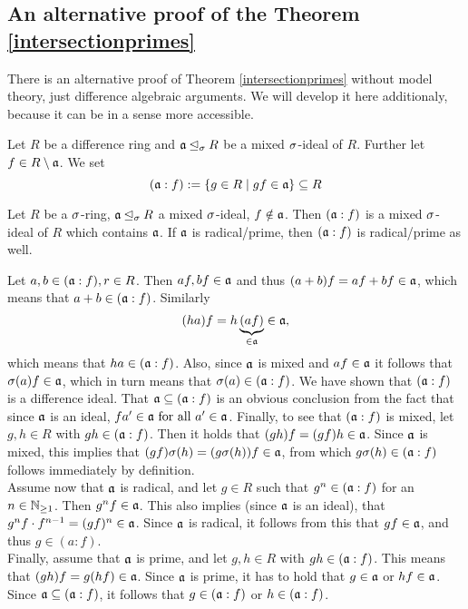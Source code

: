 \subsection{An alternative proof of the Theorem \ref{intersectionprimes}}

There is an alternative proof of Theorem \ref{intersectionprimes} without model theory, just difference algebraic arguments. We will develop it here additionaly, because it can be in a sense more accessible.

\begin{defn}
Let $R$ be a difference ring and $\mathfrak{a} \unlhd_{\sigma} R$ be a mixed $\sigma$-ideal of $R$. Further let $f \in R \setminus \mathfrak{a}$. We set $$(\mathfrak{a}:f):= \{ g \in R \mid gf \in \mathfrak{a} \} \subseteq R$$
\end{defn}

\begin{lem}
Let $R$ be a $\sigma$-ring, $\mathfrak{a} \unlhd_{\sigma} R$ a mixed $\sigma$-ideal, $f \notin \mathfrak{a}$. Then $(\mathfrak{a}:f)$ is a mixed $\sigma$-ideal of $R$ which contains $\mathfrak{a}$. If $\mathfrak{a}$ is radical/prime, then $(\mathfrak{a}:f)$ is radical/prime as well.
\begin{bew}
Let $a,b \in (\mathfrak{a}:f), r \in R$. Then $af, bf \in \mathfrak{a}$ and thus $(a + b)f = af + bf \in \mathfrak{a}$, which means that $a + b \in (\mathfrak{a}:f)$. Similarly $$(ha)f = h\underbrace{(af)}_{\in \mathfrak{a}} \in \mathfrak{a},$$
which means that $ha \in (\mathfrak{a}:f)$. Also, since $\mathfrak{a}$ is mixed and $af \in \mathfrak{a}$ it follows that $\sigma(a)f \in \mathfrak{a}$, which in turn means that $\sigma(a) \in (\mathfrak{a}:f)$. We have shown that $(\mathfrak{a}:f)$ is a difference ideal. 
That $\mathfrak{a} \subseteq (\mathfrak{a}:f)$ is an obvious conclusion from the fact that since $\mathfrak{a}$ is an ideal, $fa' \in \mathfrak{a} \text{ for all } a' \in \mathfrak{a}$.  Finally, to see that $(\mathfrak{a}:f)$ is mixed,
let $g,h \in R$ with $gh \in (\mathfrak{a}:f)$. Then it holds that $(gh)f = (gf)h  \in \mathfrak{a}$. Since $\mathfrak{a}$ is mixed, this implies that $(gf)\sigma(h) = (g\sigma(h))f \in \mathfrak{a}$, from which $g\sigma(h) \in (\mathfrak{a}:f)$ follows immediately by definition. \\
\indent Assume now that $\mathfrak{a}$ is radical, and let $g \in R$ such that $g^n \in (\mathfrak{a}:f)$ for an $n \in \mathbb{N}_{\geq1}$. Then $g^nf \in \mathfrak{a}$. This also implies (since $\mathfrak{a}$ is an ideal), that $g^nf \cdot f^{n-1} = (gf)^n \in \mathfrak{a}$.
Since $\mathfrak{a}$ is radical, it follows from this that $gf \in \mathfrak{a}$, and thus $g \in (a:f)$.\\ 
\indent Finally, assume that $\mathfrak{a}$ is prime, and let $g, h \in R$ with $gh \in (\mathfrak{a}:f)$. This means that $(gh)f = g(hf) \in \mathfrak{a}$. Since $\mathfrak{a}$ is prime, it has to hold that $g \in \mathfrak{a}$ or $hf \in \mathfrak{a}$. Since $\mathfrak{a} \subseteq (\mathfrak{a}:f)$, it follows that $g \in (\mathfrak{a}:f)$ or $h \in (\mathfrak{a}:f)$.
\end{bew}
\end{lem}

